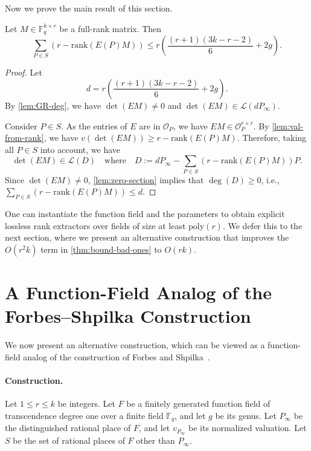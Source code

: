 \documentclass[11pt]{article}
\newcommand{\rank}{\mathrm{rank}}
\newcommand{\F}{\mathbb{F}}
\newcommand{\poly}{\mathrm{poly}}
\begin{document}
Now we prove the main result of this section.

\begin{theorem}\label{thm:bound-bad-ones}
Let $M\in \mathbb{F}_q^{k\times r}$ be a full-rank matrix.
Then 
\[
\sum_{P\in S} (r-\rank(E(P)M))\leq r\left(\frac{(r+1)(3k-r-2)}{6}+2g\right).
\]
\end{theorem}

\begin{proof}
Let
\[
d=r\left(\frac{(r+1)(3k-r-2)}{6}+2g\right).
\]
By \cref{lem:GR-deg}, we have $\det(EM)\neq 0$ and $\det(EM)\in \mathcal{L}(d P_\infty)$.

Consider $P\in S$. As the entries of $E$ are in $\mathcal{O}_P$, we have $E M\in\mathcal{O}_P^{r\times r}$. 
By \cref{lem:val-from-rank}, we have $v(\det(EM))\geq r-\rank(E(P)M)$. Therefore, taking all $P\in S$ into account, we have
\[
\det(EM)\in \mathcal{L}(D) \quad\text{where}\quad D:=dP_\infty-\sum_{P\in S} (r-\rank(E(P)M)) P.
\]
Since $\det(EM)\neq 0$, \cref{lem:zero-section} implies that $\deg(D)\geq 0$, i.e., $\sum_{P\in S} (r-\rank(E(P)M))\le d$.
\end{proof}

One can instantiate the function field and the parameters to obtain explicit lossless rank extractors over fields of size at least $\poly(r)$. We defer this to the next section, where we present an alternative construction that improves the $O(r^2 k)$ term in \cref{thm:bound-bad-ones} to $O(rk)$.

\section{A Function-Field Analog of the Forbes--Shpilka Construction}\label{sec:FS}

We now present an alternative construction, which can be viewed as a function-field analog of the construction of Forbes and Shpilka~\cite{FS12}.

\paragraph{Construction.}

Let $1\le r\le k$ be integers.
Let $F$ be a finitely generated function field of transcendence degree one over a finite field $\F_q$, and let $g$ be its genus.
Let $P_\infty$ be the distinguished rational place of $F$, and let $v_{P_\infty}$ be its normalized valuation. Let $S$ be the set of rational places of $F$ other than $P_\infty$. 
\end{document}
